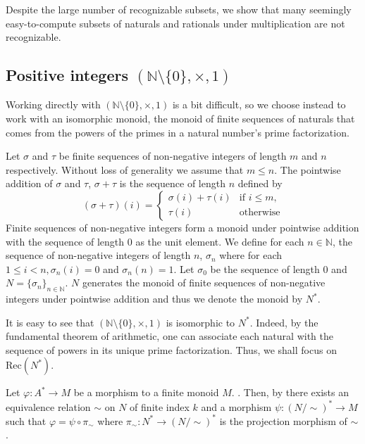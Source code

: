 \documentclass{llncs}
\begin{document}
Despite the large number of recognizable subsets, we show that many seemingly easy-to-compute subsets of naturals and rationals under multiplication are not recognizable.

\subsection{Positive integers $(\mathbb{N} \setminus \{0\}, \times, 1)$}

Working directly with $(\mathbb{N} \setminus \{0\}, \times, 1)$ is a bit difficult, so we choose instead to work with an isomorphic monoid, the monoid of finite sequences of naturals that comes from the powers of the primes in a natural number's prime factorization.

Let $\sigma$ and $\tau$ be finite sequences of non-negative integers of length $m$ and $n$ respectively. Without loss of generality we assume that $m \le n$. The pointwise addition of $\sigma$ and $\tau$, $\sigma + \tau$ is the sequence of length $n$ defined by
\begin{equation*}
    (\sigma + \tau)(i) = 
    \begin{cases}
        \sigma(i) + \tau(i) &\text{if } i \le m, \\
        \tau(i) &\text{otherwise}
    \end{cases}
\end{equation*}
Finite sequences of non-negative integers form a monoid under pointwise addition with the sequence of length 0 as the unit element. We define for each $n \in \mathbb{N}$, the sequence of non-negative integers of length $n$, $\sigma_n$ where for each $1 \le i < n, \sigma_n(i) = 0$ and $\sigma_n(n) = 1$. Let $\sigma_0$ be the sequence of length 0 and $N = \{\sigma_n\}_{n \in \mathbb{N}}$. $N$ generates the monoid of finite sequences of non-negative integers under pointwise addition and thus we denote the monoid by $N^*$.
 
It is easy to see that $(\mathbb{N} \setminus \{0\}, \times, 1)$ is isomorphic to $N^*$. Indeed, by the fundamental theorem of arithmetic, one can associate each natural with the sequence of powers in its unique prime factorization. Thus, we shall focus on $\text{Rec}(N^*)$. 

Let $\varphi: A^* \to M$ be a morphism to a finite monoid $M$. . Then, by  there exists an equivalence relation $\sim$ on $N$ of finite index $k$ and a morphism $\psi: (N/\sim)^* \to M$ such that $\varphi = \psi \circ \pi_\sim$ where $\pi_\sim: N^* \to (N/\sim)^*$ is the projection morphism of $\sim$. 
\end{document}
